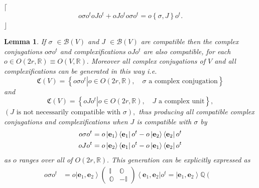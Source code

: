 \documentclass[aps,preprint]{revtex4}
\newtheorem{lemma}[theorem]{Lemma}
\begin{document}
$\lceil$%
\begin{equation}
o\sigma o^{t}oJo^{t}+oJo^{t}o\sigma o^{t}=o\left\{ \sigma,J\right\} o^{t}.
\end{equation}
$\rfloor$

\begin{lemma}
If $\sigma $ $\in \mathcal{B}\left( V\right) $ and $J$ $\in \mathcal{B}%
\left( V\right) $ are \emph{compatible} then the complex conjugations $%
o\sigma o^{t}$ and complexifications $oJo^{t}$ are also \emph{compatible},
for each $o\in O\left( 2r,\mathbb{R}\right) \equiv O\left( V,\mathbb{R}%
\right) .$ Moreover \emph{all} complex conjugations of $V$ and \emph{all }%
complexifications can be generated in this way i.e.%
\begin{equation}
\mathfrak{C}\left( V\right) =\left\{ \left. o\sigma o^{t}\right\vert o\in
O\left( 2r,\mathbb{R}\right) ,\quad \sigma \text{ a complex conjugation}%
\right\}
\end{equation}%
and 
\begin{equation}
\mathfrak{C}\left( V\right) =\left\{ \left. oJo^{t}\right\vert o\in O\left(
2r,\mathbb{R}\right) ,\quad J\text{ a complex unit}\right\} ,
\end{equation}%
$\left( J\text{ is not necessarily compatible with }\sigma \right) ,$ thus
producing \emph{all} compatible complex conjugations and complexifications
when $J$ is compatible with $\sigma $ by 
\begin{align}
o\sigma o^{t}& =o\left\vert \mathbf{e}_{1}\right\rangle \left\langle \mathbf{%
e}_{1}\right\vert o^{t}-o\left\vert \mathbf{e}_{2}\right\rangle \left\langle 
\mathbf{e}_{2}\right\vert o^{t} \\
oJo^{t}& =o\left\vert \mathbf{e}_{2}\right\rangle \left\langle \mathbf{e}%
_{1}\right\vert o^{t}-o\left\vert \mathbf{e}_{1}\right\rangle \left\langle 
\mathbf{e}_{2}\right\vert o^{t}
\end{align}%
as $o$ ranges over all of $O\left( 2r,\mathbb{R}\right) .$ This generation
can be explicitly expressed as%
\begin{align}
o\sigma o^{t}& =o\left\vert \mathbf{e}_{1},\mathbf{e}_{2}\right\rangle
\left( 
\begin{array}{cc}
\mathbb{I} & \mathbb{O} \\ 
\mathbb{O} & -\mathbb{I}%
\end{array}%
\right) \left\langle \mathbf{e}_{1},\mathbf{e}_{2}\right\vert
o^{t}=\left\vert \mathbf{e}_{1},\mathbf{e}_{2}\right\rangle \mathbb{Q}\left( 
\begin{array}{cc}

\end{array}
\end{align}
\end{lemma}
\end{document}
